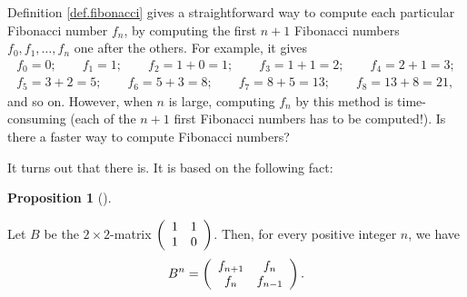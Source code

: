 \documentclass[numbers=enddot,12pt,final,onecolumn,notitlepage]{scrartcl}%
\theoremstyle{definition}
\newtheorem{prop}[theo]{Proposition}
\newenvironment{proposition}[1][]
{\begin{prop}[#1]\begin{leftbar}}
{\end{leftbar}\end{prop}}
\begin{document}
Definition \ref{def.fibonacci} gives a straightforward way to compute each
particular Fibonacci number $f_{n}$, by computing the first $n+1$ Fibonacci
numbers $f_{0},f_{1},\ldots,f_{n}$ one after the others. For example, it
gives
\begin{align*}
f_{0} = 0; \qquad f_{1} = 1; \qquad f_{2} = 1+0 = 1; \qquad f_{3} = 1+1 = 2;
\qquad f_{4} = 2+1 = 3;\\
f_{5} = 3+2 = 5; \qquad f_{6} = 5+3 = 8; \qquad f_{7} = 8+5 = 13; \qquad f_{8}
= 13+8 = 21,
\end{align*}
and so on. However, when $n$ is large, computing $f_{n}$ by this method is
time-consuming (each of the $n+1$ first Fibonacci numbers has to be
computed!). Is there a faster way to compute Fibonacci numbers?

It turns out that there is. It is based on the following fact:

\begin{proposition}
\label{prop.fibonacci.matrix}Let $B$ be the $2\times2$-matrix $\left(
\begin{array}
[c]{cc}%
1 & 1\\
1 & 0
\end{array}
\right)  $. Then, for every positive integer $n$, we have%
\begin{equation}
B^{n}=\left(
\begin{array}
[c]{cc}%
f_{n+1} & f_{n}\\
f_{n} & f_{n-1}%
\end{array}
\right)  . \label{eq.prop.fibonacci.matrix.1}%
\end{equation}

\end{proposition}
\end{document}
